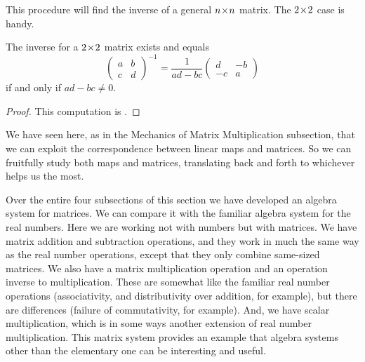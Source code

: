 This procedure will find the inverse of a general $n \! \times \! n$ matrix.
The $2 \! \times \! 2$ case is handy.

\begin{corollary}
\label{cor:TwoByTwoInv}
The inverse for a \( 2 \! \times \! 2 \) matrix exists and equals
\begin{equation*}
  \begin{pmatrix}
    a  &b  \\
    c  &d
  \end{pmatrix}^{-1}
  =
  \frac{1}{ad-bc}
  \begin{pmatrix}
    d  &-b \\
   -c  &a
  \end{pmatrix}
\end{equation*}
if and only if \( ad-bc\neq 0 \).
\end{corollary}
\begin{proof}
This computation is 
. 
\end{proof}

We have seen here, as in the Mechanics of Matrix Multiplication subsection,
that we can exploit the correspondence between
linear maps and matrices.
So we can fruitfully study both maps and matrices, translating back and forth
to whichever helps us the most.

Over the entire four subsections of 
this section we have developed an algebra system for matrices.
We can compare it with the familiar algebra system for the real numbers.
Here we are working not with numbers but with matrices.
We have matrix addition and subtraction operations, 
and they work in much the same
way as the real number operations, except that they only combine same-sized
matrices.
We also have a matrix multiplication operation 
and an operation inverse to multiplication.
These are somewhat like the familiar real number operations
(associativity, and distributivity over addition, for example), but
there are differences (failure of commutativity, for example). 
And, we have scalar multiplication, which is in some ways another extension
of real number multiplication.
This matrix system provides an example that algebra
systems other than the 
elementary one can be interesting and useful.



